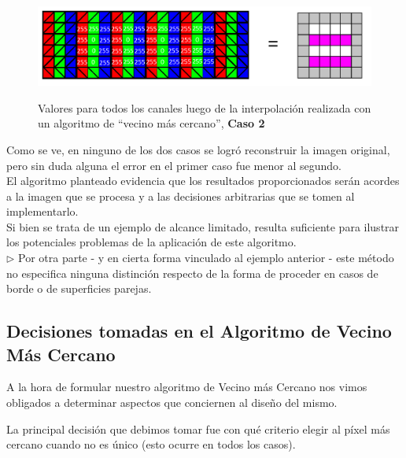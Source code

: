 \documentclass[a4paper]{article}
\begin{document}
\begin{figure}[h!]
    \caption{ Valores para todos los canales luego de la interpolación realizada con un algoritmo de ``vecino más cercano'', \textbf{Caso 2}}
    \begin{center}
    \includegraphics[scale=0.45]{imagenes/apxlvecinoOTRO2}
    \label{apxlvecinoOTRO2}
  \end{center}
\end{figure}

\newpage

Como se ve, en ninguno de los dos casos se logró reconstruir la imagen original, pero sin duda alguna el error en el primer caso fue menor al segundo.\\

El algoritmo planteado evidencia que los resultados proporcionados serán acordes a la imagen que se procesa y a las decisiones arbitrarias que se tomen al implementarlo. \\

Si bien se trata de un ejemplo de alcance limitado, resulta suficiente para ilustrar los potenciales problemas de la aplicación de este algoritmo.\\



$\triangleright$ Por otra parte - y en cierta forma vinculado al ejemplo anterior - este método no especifica ninguna distinción respecto de la forma de proceder en casos de borde o de superficies parejas. \\


\newpage
\subsection*{Decisiones tomadas en el Algoritmo de Vecino M\'as Cercano}

A la hora de formular nuestro algoritmo de Vecino m\'as Cercano nos vimos obligados a determinar aspectos que conciernen al dise\~no del mismo. 

La principal decisi\'on que debimos tomar fue con qu\'e criterio elegir al p\'ixel m\'as cercano cuando no es \'unico (esto ocurre en todos los casos). 
\end{document}
